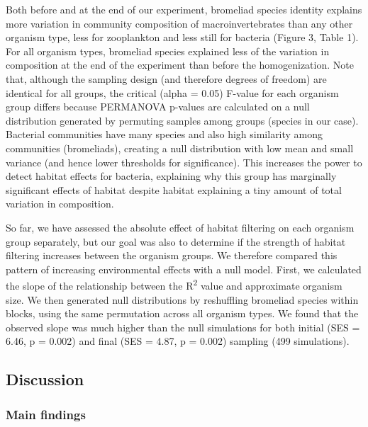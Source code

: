 \documentclass[12pt,]{article}
\begin{document}
Both before and at the end of our experiment, bromeliad species identity
explains more variation in community composition of macroinvertebrates
than any other organism type, less for zooplankton and less still for
bacteria (Figure 3, Table 1). For all organism types, bromeliad species
explained less of the variation in composition at the end of the
experiment than before the homogenization. Note that, although the
sampling design (and therefore degrees of freedom) are identical for all
groups, the critical (alpha = 0.05) F-value for each organism group
differs because PERMANOVA p-values are calculated on a null distribution
generated by permuting samples among groups (species in our case).
Bacterial communities have many species and also high similarity among
communities (bromeliads), creating a null distribution with low mean and
small variance (and hence lower thresholds for significance). This
increases the power to detect habitat effects for bacteria, explaining
why this group has marginally significant effects of habitat despite
habitat explaining a tiny amount of total variation in composition.

So far, we have assessed the absolute effect of habitat filtering on
each organism group separately, but our goal was also to determine if
the strength of habitat filtering increases between the organism groups.
We therefore compared this pattern of increasing environmental effects
with a null model. First, we calculated the slope of the relationship
between the R\textsuperscript{2} value and approximate organism size. We
then generated null distributions by reshuffling bromeliad species
within blocks, using the same permutation across all organism types. We
found that the observed slope was much higher than the null simulations
for both initial (SES = 6.46, p = 0.002) and final (SES = 4.87, p =
0.002) sampling (499 simulations).

\subsection{Discussion}\label{discussion}

\subsubsection{Main findings}\label{main-findings}
\end{document}
